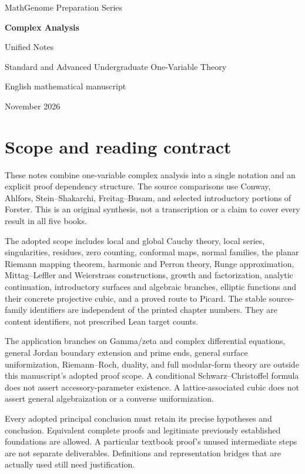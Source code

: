 \documentclass[11pt,a4paper,openany]{book}
\theoremstyle{definition}
\theoremstyle{remark}\newtheorem{remark}[theorem]{Remark}
\begin{document}
\frontmatter
\begin{titlepage}\centering
{\Large MathGenome Preparation Series\par}\vspace{25mm}
{\Huge\bfseries Complex Analysis\par}\vspace{8mm}
{\LARGE Unified Notes\par}\vspace{12mm}
{\large Standard and Advanced Undergraduate One-Variable Theory\par}
\vfill{English mathematical manuscript\par November 2026}
\end{titlepage}
\chapter*{Scope and reading contract}
These notes combine one-variable complex analysis into a single notation and
an explicit proof dependency structure. The source comparisons use Conway,
Ahlfors, Stein--Shakarchi, Freitag--Busam, and selected introductory portions of
Forster. This is an original synthesis, not a transcription or a claim to cover
every result in all five books.

The adopted scope includes local and global Cauchy theory, local series,
singularities, residues, zero counting, conformal maps, normal families, the
planar Riemann mapping theorem, harmonic and Perron theory, Runge approximation,
Mittag--Leffler and Weierstrass constructions, growth and factorization,
analytic continuation, introductory surfaces and algebraic branches, elliptic
functions and their concrete projective cubic, and a proved route to Picard.
The stable source-family identifiers are independent of the printed chapter
numbers. They are content identifiers, not prescribed Lean target counts.

The application branches on Gamma/zeta and complex differential equations,
general Jordan boundary extension and prime ends, general surface
uniformization, Riemann--Roch, duality, and full modular-form theory are outside
this manuscript's adopted proof scope. A conditional Schwarz--Christoffel
formula does not assert accessory-parameter existence. A lattice-associated
cubic does not assert general algebraization or a converse uniformization.

Every adopted principal conclusion must retain its precise hypotheses and
conclusion. Equivalent complete proofs and legitimate previously established
foundations are allowed. A particular textbook proof's unused intermediate
steps are not separate deliverables. Definitions and representation bridges
that are actually used still need justification.
\end{document}
